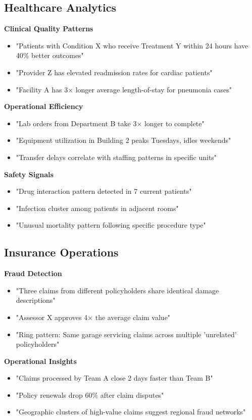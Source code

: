 \documentclass[11pt]{article}
\begin{document}
\subsection{Healthcare Analytics}

\textbf{Clinical Quality Patterns}
\begin{itemize}
\item "Patients with Condition X who receive Treatment Y within 24 hours have 40\% better outcomes"
\item "Provider Z has elevated readmission rates for cardiac patients"
\item "Facility A has 3× longer average length-of-stay for pneumonia cases"
\end{itemize}

\textbf{Operational Efficiency}
\begin{itemize}
\item "Lab orders from Department B take 3× longer to complete"
\item "Equipment utilization in Building 2 peaks Tuesdays, idles weekends"
\item "Transfer delays correlate with staffing patterns in specific units"
\end{itemize}

\textbf{Safety Signals}
\begin{itemize}
\item "Drug interaction pattern detected in 7 current patients"
\item "Infection cluster among patients in adjacent rooms"
\item "Unusual mortality pattern following specific procedure type"
\end{itemize}

\subsection{Insurance Operations}

\textbf{Fraud Detection}
\begin{itemize}
\item "Three claims from different policyholders share identical damage descriptions"
\item "Assessor X approves 4× the average claim value"
\item "Ring pattern: Same garage servicing claims across multiple 'unrelated' policyholders"
\end{itemize}

\textbf{Operational Insights}
\begin{itemize}
\item "Claims processed by Team A close 2 days faster than Team B"
\item "Policy renewals drop 60\% after claim disputes"
\item "Geographic clusters of high-value claims suggest regional fraud networks"
\end{itemize}
\end{document}
